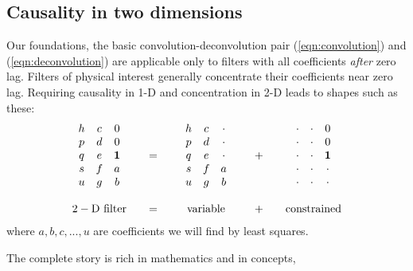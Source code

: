 \subsection{Causality in two dimensions}
Our foundations,
the basic convolution-deconvolution pair
(\ref{eqn:convolution}) and
(\ref{eqn:deconvolution})
are applicable only to filters with all coefficients {\it after} zero lag.
Filters of physical interest generally concentrate their coefficients near zero lag.
Requiring causality in 1-D and concentration in 2-D leads to shapes such as these:
\begin{equation}
\label{eqn:2dpef}
\begin{array}{ccccc}
        \begin{array}{ccc}
                h  & c &   0 \\
                p  & d &   0 \\
                q  & e &  \bold 1    \\
                s  & f &   a \\
                u  & g &   b
        \end{array}
        &\quad=\quad&
        \begin{array}{ccc}
                h  & c &  \cdot   \\
                p  & d &  \cdot   \\
                q  & e &  \cdot    \\
                s  & f &   a \\
                u  & g &   b
        \end{array}
         &\quad +\quad&
        \begin{array}{ccc}
                \cdot &\cdot &   0 \\
                \cdot &\cdot &   0 \\
                \cdot &\cdot &  \bold 1    \\
                \cdot &\cdot &  \cdot    \\
                \cdot &\cdot &  \cdot  
        \end{array}
  \\
  \\
        {\rm 2-D \ filter}
           &=&
        {\rm variable}
          &\quad +\quad&
        {\rm constrained}
\end{array}
\end{equation}
where $a,b,c,...,u$ are coefficients we will find by least squares.
\par
The complete story is rich in mathematics and in concepts,
